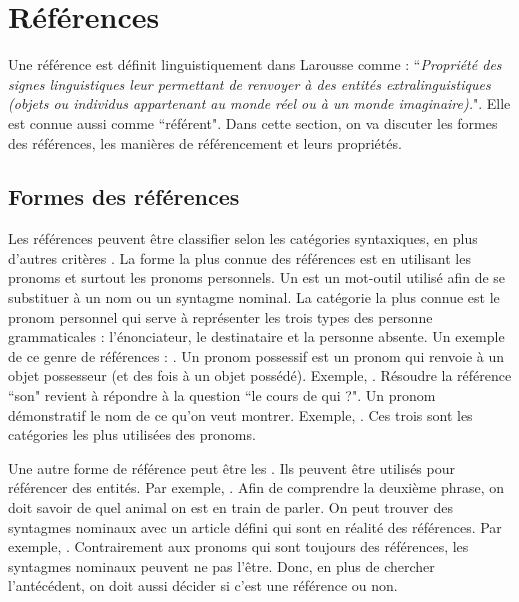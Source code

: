 \documentclass{KodeBook}
\begin{document}
\section{Références}

Une référence est définit linguistiquement dans Larousse comme : ``\textit{Propriété des signes linguistiques leur permettant de renvoyer à des entités extralinguistiques (objets ou individus appartenant au monde réel ou à un monde imaginaire).}". 
Elle est connue aussi comme ``référent".
Dans cette section, on va discuter les formes des références, les manières de référencement et leurs propriétés.

\subsection{Formes des références}

Les références peuvent être classifier selon les catégories syntaxiques, en plus d'autres critères \cite{2015-schmolz}.
La forme la plus connue des références est en utilisant les pronoms et surtout les pronoms personnels.
Un  est un mot-outil utilisé afin de se substituer à un nom ou un syntagme nominal. 
La catégorie la plus connue est le pronom personnel qui serve à représenter les trois types des personne grammaticales : l'énonciateur, le destinataire et la personne absente. 
Un exemple de ce genre de références :  .
Un pronom possessif est un pronom qui renvoie à un objet possesseur (et des fois à un objet possédé).
Exemple, .
Résoudre la référence ``son" revient à répondre à la question ``le cours de qui ?". 
Un pronom démonstratif le nom de ce qu'on veut montrer.
Exemple, . 
Ces trois sont les catégories les plus utilisées des pronoms.

Une autre forme de référence peut être les .
Ils peuvent être utilisés pour référencer des entités.
Par exemple, .
Afin de comprendre la deuxième phrase, on doit savoir de quel animal on est en train de parler. 
On peut trouver des syntagmes nominaux avec un article défini qui sont en réalité des références. 
Par exemple, .
Contrairement aux pronoms qui sont toujours des références, les syntagmes nominaux peuvent ne pas l'être. 
Donc, en plus de chercher l'antécédent, on doit aussi décider si c'est une référence ou non.
\end{document}
